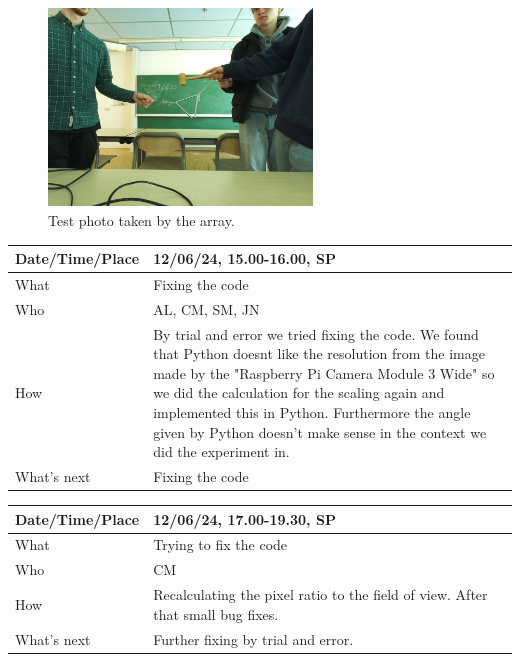 \documentclass{article}
\begin{document}
\begin{figure}[H]
    \centering
    \includegraphics[width=7cm]{savedimage.jpg}
    \caption{Test photo taken by the array.}   
\end{figure}

\begin{table}[H]
\begin{tabular}{|p{1.5in}|p{4in}|}
\hline
Date/Time/Place & 12/06/24, 15.00-16.00, SP \\ \hline
What            &  Fixing the code\\ \hline
Who             &  AL, CM, SM, JN\\ \hline
How             & By trial and error we tried fixing the code. We found that Python doesnt like the resolution from the image made by the "Raspberry Pi Camera Module 3 Wide" so we did the calculation for the scaling again and implemented this in Python. Furthermore the angle given by Python doesn't make sense in the context we did the experiment in.   \\ \hline
What's next     & Fixing the code \\ \hline
\end{tabular}
\end{table}

\begin{table}[H]
\begin{tabular}{|p{1.5in}|p{4in}|}
\hline
Date/Time/Place & 12/06/24, 17.00-19.30, SP \\ \hline
What            & Trying to fix the code \\ \hline
Who             & CM \\ \hline
How             & Recalculating the pixel ratio to the field of view. After that small bug fixes. \\ \hline
What's next     & Further fixing by trial and error.  \\ \hline
\end{tabular}
\end{table}
\end{document}
